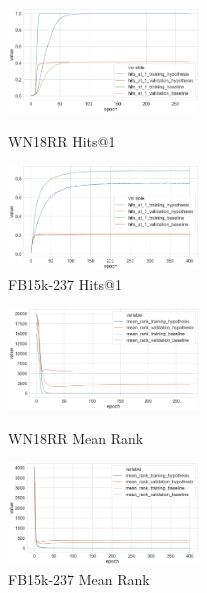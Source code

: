 
\begin{figure}[H]
	\parbox{.5\linewidth}{
   		\centering
    		\includegraphics[width=0.45\textwidth, height=0.2\textheight]{WN18RR_hits_at_1_Results}
		\caption{WN18RR Hits@1}
		}
	\hfill
	\parbox{.5\linewidth}{
   		\centering
		\includegraphics[width=0.45\textwidth, height=0.2\textheight]{FB15k-237_hits_at_1_Results}
		\caption{FB15k-237 Hits@1}
		}
\end{figure}


\begin{figure}[H]
	\parbox{.5\linewidth}{
   		\centering
    		\includegraphics[width=0.45\textwidth, height=0.2\textheight]{WN18RR_mean_rank_Results}
		\caption{WN18RR Mean Rank}
		}
	\hfill
	\parbox{.5\linewidth}{
   		\centering
		\includegraphics[width=0.45\textwidth, height=0.2\textheight]{FB15k-237_mean_rank_Results}
		\caption{FB15k-237 Mean Rank}
		}
\end{figure}

